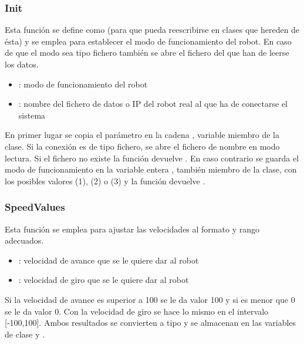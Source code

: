 \subsubsection{Init}

\noindent
{}

\noindent
Esta función se define como  (para que pueda reescribirse en clases que hereden de ésta) y se emplea para establecer el modo de funcionamiento del robot. En caso de que el modo sea tipo fichero también se abre el fichero del que han de leerse los datos.

\begin{itemize}
  \item {}: modo de funcionamiento del robot
  \item {}: nombre del fichero de datos o IP del robot real al que ha de conectarse el sistema
\end{itemize}

\noindent
En primer lugar se copia el parámetro  en la cadena , variable miembro de la clase. Si la conexión es de tipo fichero, se abre el fichero de nombre  en modo lectura. Si el fichero no existe la función devuelve . En caso contrario se guarda el modo de funcionamiento en la variable entera , también miembro de la clase, con los posibles valores  (1),  (2) o  (3) y la función devuelve .

\subsubsection{SpeedValues}

\noindent
{}

\noindent
Esta función se emplea para ajustar las velocidades al formato y rango adecuados.

\begin{itemize}
  \item {}: velocidad de avance que se le quiere dar al robot
  \item {}: velocidad de giro que se le quiere dar al robot
\end{itemize}

\noindent
Si la velocidad de avance es superior a 100 se le da valor 100 y si es menor que 0 se le da valor 0. Con la velocidad de giro se hace lo mismo en el intervalo [-100,100]. Ambos resultados se convierten a tipo  y se almacenan en las variables de clase  y .


